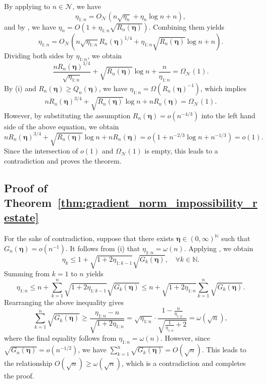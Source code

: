 \documentclass[11pt]{article}
\newcommand{\N}{\mathbb{N}}
\newcommand{\schedule}{\bm{\eta}}
\begin{document}
By applying  to $n\in\mathcal{N}$, we have
\[
	\eta_{1:n} = O_{\mathcal{N}}\left( n\sqrt{\eta_n} + \eta_n \log n + n \right),
\]
and by , we have $\eta_n = O\left( 1 + \eta_{1:n}\sqrt{R_n(\schedule)} \right)$.
Combining them yields
\[
	\eta_{1:n} = O_{\mathcal{N}}\left( n\sqrt{ \eta_{1:n} }R_n(\schedule)^{1/4} + \eta_{1:n}\sqrt{R_n(\schedule)}\log n + n \right).
\]
Dividing both sides by $\eta_{1:n}$, we obtain
\[
	\frac{ nR_n(\schedule)^{1/4} }{ \sqrt{\eta_{1:n}} }  + \sqrt{R_n(\schedule)}\log n + \frac{n}{\eta_{1:n}} = \Omega_{\mathcal{N}}(1).
\]
By  (i) and $R_n(\schedule)\geq Q_n(\schedule)$, we have $\eta_{1:n} = \Omega(R_n(\schedule)^{-1})$, which implies
\[
	n R_n(\schedule)^{3/4} + \sqrt{R_n(\schedule)}\log n + nR_n(\schedule) = \Omega_{\mathcal{N}}(1).
\]
However, by substituting the assumption $R_n(\schedule)=o(n^{-4/3})$ into the left hand side of the above equation, we obtain
\[
	n R_n(\schedule)^{3/4} + \sqrt{R_n(\schedule)}\log n + nR_n(\schedule) = o\left(1 + n^{-2/3}\log n + n^{-1/3}\right)
	= o(1).
\]
Since the intersection of $o(1)$ and $\Omega_{\mathcal{N}}(1)$ is empty, this leads to a contradiction and proves the theorem.



\subsection{Proof of Theorem~\ref{thm:gradient_norm_impossibility_restate}}

For the sake of contradiction, suppose that there exists $\schedule\in(0,\infty)^{\N}$ such that $G_n(\schedule) = o(n^{-1})$.
It follows from  (i) that $\eta_{1:n}=\omega(n)$.
Applying , we obtain
\[
	\eta_k \leq 1 + \sqrt{1+2\eta_{1:k-1}}\sqrt{G_k(\schedule)},\quad\forall k\in\N.
\]
Summing from $k=1$ to $n$ yields
\[
	\eta_{1:n} \leq n + \sum_{k=1}^n \sqrt{1+2\eta_{1:k-1}}\sqrt{G_k(\schedule)}
	\leq n + \sqrt{1+2\eta_{1:n}} \sum_{k=1}^n \sqrt{G_k(\schedule)}.
\]
Rearranging the above inequality gives
\[
	\sum_{k=1}^n \sqrt{G_k(\schedule)} \geq \frac{ \eta_{1:n} - n}{ \sqrt{1+2\eta_{1:n}} }
	= \sqrt{\eta_{1:n}}\cdot\frac{1- \frac{n}{\eta_{1:n}}}{\sqrt{\frac{1}{\eta_{1:n}} + 2}}
	= \omega(\sqrt{n}),
\]
where the final equality follows from $\eta_{1:n}=\omega(n)$.
However, since $\sqrt{G_n(\schedule)} = o(n^{-1/2})$, we have $\sum_{k=1}^n \sqrt{G_k(\schedule)} = O(\sqrt{n})$.
This leads to the relationship $O(\sqrt{n}) \geq \omega(\sqrt{n})$, which is a contradiction and completes the proof.
\end{document}
